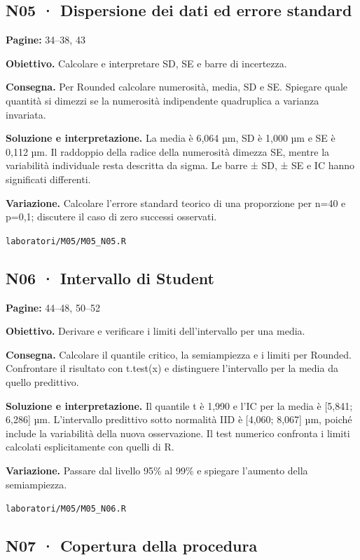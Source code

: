 \documentclass[11pt,a4paper]{article}
\begin{document}
\newpage

\subsection*{N05 · Dispersione dei dati ed errore standard}

\textbf{Pagine:} 34–38, 43

\textbf{Obiettivo.} Calcolare e interpretare SD, SE e barre di incertezza.

\textbf{Consegna.} Per Rounded calcolare numerosità, media, SD e SE. Spiegare quale quantità si dimezzi se la numerosità indipendente quadruplica a varianza invariata.

\textbf{Soluzione e interpretazione.} La media è 6,064 µm, SD è 1,000 µm e SE è 0,112 µm. Il raddoppio della radice della numerosità dimezza SE, mentre la variabilità individuale resta descritta da sigma. Le barre ± SD, ± SE e IC hanno significati differenti.

\textbf{Variazione.} Calcolare l’errore standard teorico di una proporzione per n=40 e p=0,1; discutere il caso di zero successi osservati.

\texttt{laboratori/M05/M05\_N05.R}

\subsection*{N06 · Intervallo di Student}

\textbf{Pagine:} 44–48, 50–52

\textbf{Obiettivo.} Derivare e verificare i limiti dell’intervallo per una media.

\textbf{Consegna.} Calcolare il quantile critico, la semiampiezza e i limiti per Rounded. Confrontare il risultato con t.test(x) e distinguere l’intervallo per la media da quello predittivo.

\textbf{Soluzione e interpretazione.} Il quantile t è 1,990 e l’IC per la media è [5,841; 6,286] µm. L’intervallo predittivo sotto normalità IID è [4,060; 8,067] µm, poiché include la variabilità della nuova osservazione. Il test numerico confronta i limiti calcolati esplicitamente con quelli di R.

\textbf{Variazione.} Passare dal livello 95\% al 99\% e spiegare l’aumento della semiampiezza.

\texttt{laboratori/M05/M05\_N06.R}

\newpage

\subsection*{N07 · Copertura della procedura}
\end{document}
